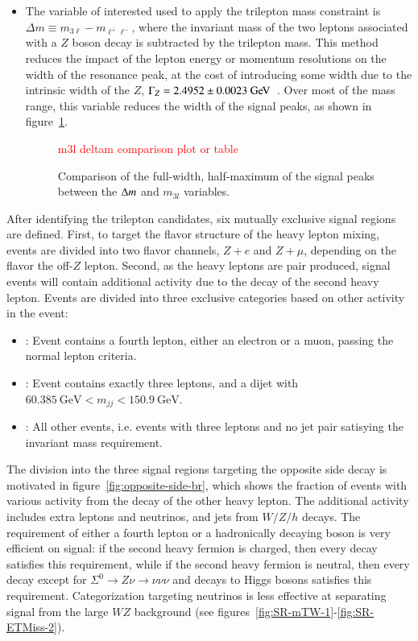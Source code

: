 \begin{itemize}
	\item The variable of interested used to apply the trilepton mass constraint is $\Delta m \equiv m_{3\ell}-m_{\ell^+\ell^-}$, where the invariant mass of the two leptons associated with a $Z$ boson decay is subtracted by the trilepton mass. This method reduces the impact of the lepton energy or momentum resolutions on the width of the resonance peak, at the cost of introducing some width due to the intrinsic width of the $Z$, $\Gamma_Z=2.4952\pm0.0023 \GeV$~\cite{pdg}. Over most of the mass range, this variable reduces the width of the signal peaks, as shown in figure~\ref{fig:deltam-m3l-comparison}. 

	\begin{figure}[htbp]
		\textcolor{red}{m3l deltam comparison plot or table}
		\caption{Comparison of the full-width, half-maximum of the signal peaks between the $\Delta m$ and $m_{3l}$ variables.}
		\label{fig:deltam-m3l-comparison}
	\end{figure}
	  
\end{itemize}

After identifying the trilepton candidates, six mutually exclusive signal regions are defined. First, to target the flavor structure of the heavy lepton mixing, events are divided into two flavor channels, $Z+e$ and $Z+\mu$, depending on the flavor the off-$Z$ lepton. Second, as the heavy leptons are pair produced, signal events will contain additional activity due to the decay of the second heavy lepton. Events are divided into three exclusive categories based on other activity in the event:
  \begin{itemize}
  	\item \textbf{\fourl}: Event contains a fourth lepton, either an electron or a muon, passing the normal lepton criteria. 
  	\item \textbf{\threeljj}: Event contains exactly three leptons, and a dijet with $60.385~\mbox{GeV}<m_{jj}<150.9~\mbox{GeV}$. 
  	\item \textbf{\threelo}: All other events, i.e. events with three leptons and no jet pair satisying the invariant mass requirement. 
  \end{itemize}

 The division into the three signal regions targeting the opposite side decay is motivated in figure~\ref{fig:opposite-side-br}, which shows the fraction of events with various activity from the decay of the other heavy lepton. The additional activity includes extra leptons and neutrinos, and jets from $W/Z/h$ decays. The requirement of either a fourth lepton or a hadronically decaying boson is very efficient on signal: if the second heavy fermion is charged, then every decay satisfies this requirement, while if the second heavy fermion is neutral, then every decay except for $\Sigma^0\rightarrow Z\nu\rightarrow \nu\nu\nu$ and decays to Higgs bosons satisfies this requirement. Categorization targeting neutrinos is less effective at separating signal from the large $WZ$ background (see figures~\ref{fig:SR-mTW-1}-\ref{fig:SR-ETMiss-2}). 


